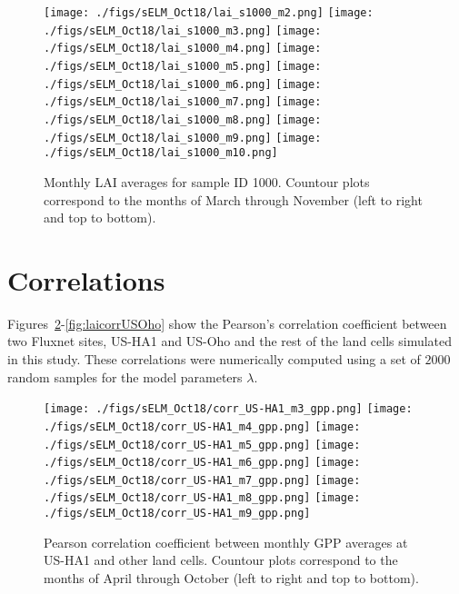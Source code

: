 \documentclass[10pt]{article}
\begin{document}
\begin{figure}[htb!]
\centering
\texttt{[image: ./figs/sELM\_Oct18/lai\_s1000\_m2.png]}
\texttt{[image: ./figs/sELM\_Oct18/lai\_s1000\_m3.png]}
\texttt{[image: ./figs/sELM\_Oct18/lai\_s1000\_m4.png]}
\texttt{[image: ./figs/sELM\_Oct18/lai\_s1000\_m5.png]}
\texttt{[image: ./figs/sELM\_Oct18/lai\_s1000\_m6.png]}
\texttt{[image: ./figs/sELM\_Oct18/lai\_s1000\_m7.png]}
\texttt{[image: ./figs/sELM\_Oct18/lai\_s1000\_m8.png]}
\texttt{[image: ./figs/sELM\_Oct18/lai\_s1000\_m9.png]}
\texttt{[image: ./figs/sELM\_Oct18/lai\_s1000\_m10.png]}
\caption{Monthly LAI averages for sample ID 1000. Countour plots correspond to the months of March through November (left to right and top to bottom).\label{fig:laiavg1000}}
\end{figure}

\section{Correlations}

Figures~\ref{fig:gppcorrUSHA1}-\ref{fig:laicorrUSOho} show the Pearson's correlation
coefficient between two Fluxnet sites, US-HA1 and US-Oho and the rest of the land cells
simulated in this study. These correlations were numerically computed using a set
of $2000$ random samples for the model parameters $\lambda$.

\begin{figure}[htb!]
\centering
\texttt{[image: ./figs/sELM\_Oct18/corr\_US-HA1\_m3\_gpp.png]}
\texttt{[image: ./figs/sELM\_Oct18/corr\_US-HA1\_m4\_gpp.png]}
\texttt{[image: ./figs/sELM\_Oct18/corr\_US-HA1\_m5\_gpp.png]}
\texttt{[image: ./figs/sELM\_Oct18/corr\_US-HA1\_m6\_gpp.png]}
\texttt{[image: ./figs/sELM\_Oct18/corr\_US-HA1\_m7\_gpp.png]}
\texttt{[image: ./figs/sELM\_Oct18/corr\_US-HA1\_m8\_gpp.png]}
\texttt{[image: ./figs/sELM\_Oct18/corr\_US-HA1\_m9\_gpp.png]}
\caption{Pearson correlation coefficient between monthly GPP averages at US-HA1 and other land cells. 
Countour plots correspond to the months of April through October (left to right and top to bottom).
\label{fig:gppcorrUSHA1}}
\end{figure}
\end{document}
